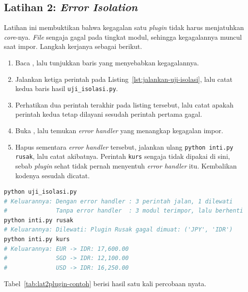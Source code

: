 \subsection*{Latihan 2: \textit{Error Isolation}}

Latihan ini membuktikan bahwa kegagalan satu \textit{plugin} tidak harus
menjatuhkan \textit{core}-nya. \textit{File}  sengaja
gagal pada tingkat modul, sehingga kegagalannya muncul saat impor. Langkah
kerjanya sebagai berikut.

\begin{enumerate}
  \item Baca , lalu
    tunjukkan baris yang menyebabkan kegagalannya.
  \item Jalankan ketiga perintah pada Listing~\ref{lst:jalankan-uji-isolasi},
    lalu catat kedua baris hasil \texttt{uji\_isolasi.py}.
  \item Perhatikan dua perintah terakhir pada listing tersebut, lalu catat
    apakah perintah kedua tetap dilayani sesudah perintah pertama gagal.
  \item Buka , lalu temukan \textit{error
    handler} yang menangkap kegagalan impor.
  \item Hapus sementara \textit{error handler} tersebut, jalankan ulang
    \texttt{python inti.py rusak}, lalu catat akibatnya. Perintah
    \texttt{kurs} sengaja tidak dipakai di sini, sebab \textit{plugin} sehat
    tidak pernah menyentuh \textit{error handler} itu. Kembalikan kodenya
    sesudah dicatat.
\end{enumerate}

\begin{lstlisting}[language=bash, caption={Menjalankan satu \textit{plugin} yang
  rusak beserta perintah sesudahnya}, label=lst:jalankan-uji-isolasi]
python uji_isolasi.py
# Keluarannya: Dengan error handler : 3 perintah jalan, 1 dilewati
#              Tanpa error handler  : 3 modul terimpor, lalu berhenti
python inti.py rusak
# Keluarannya: Dilewati: Plugin Rusak gagal dimuat: ('JPY', 'IDR')
python inti.py kurs
# Keluarannya: EUR -> IDR: 17,600.00
#              SGD -> IDR: 12,100.00
#              USD -> IDR: 16,250.00
\end{lstlisting}

Tabel~\ref{tab:lat2plugin-contoh} berisi hasil satu kali percobaan nyata.

